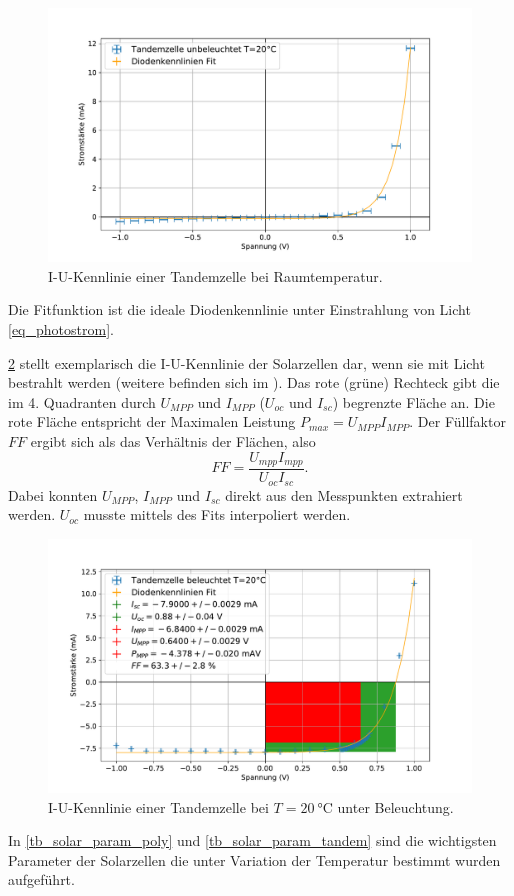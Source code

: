 \documentclass[
	a4paper,
	12pt,
	pagesize,
	ngerman
]{scrartcl}
\begin{document}
	\begin{figure}[H]
			\includegraphics[width=.9\linewidth]{img/Tandemzelle_unbeleuchtet_20.pdf}
			\caption{
				I-U-Kennlinie einer Tandemzelle bei Raumtemperatur.
								}
			\label{fig_tandem_unbeleuchtet_20}
	\end{figure}

	Die Fitfunktion ist die ideale Diodenkennlinie unter Einstrahlung von Licht \cref{eq_photostrom}.

	\cref{fig_tandem_beleuchtet_20} stellt exemplarisch die I-U-Kennlinie der Solarzellen dar, wenn sie mit Licht bestrahlt werden (weitere befinden sich im ).
	Das rote (grüne) Rechteck gibt die im 4. Quadranten durch $U_{MPP}$ und $I_{MPP}$ ($U_{oc}$ und $I_{sc}$) begrenzte Fläche an.
	Die rote Fläche entspricht der Maximalen Leistung $P_{max} = U_{MPP}I_{MPP}$.
	Der Füllfaktor $FF$ ergibt sich als das Verhältnis der Flächen, also
	\begin{equation}
		FF = \frac{U_{mpp}I_{mpp}}{U_{oc}I_{sc}}.
	\end{equation}
	Dabei konnten $U_{MPP}$, $I_{MPP}$ und $I_{sc}$ direkt aus den Messpunkten extrahiert werden.
	$U_{oc}$ musste mittels des Fits interpoliert werden.


	\begin{figure}[H]
			\includegraphics[width=.9\linewidth]{img/Tandemzelle_beleuchtet_20.pdf}
			\caption{
				I-U-Kennlinie einer Tandemzelle bei $T=\SI{20}{\celsius}$ unter Beleuchtung.
								}
			\label{fig_tandem_beleuchtet_20}
	\end{figure}
	In \cref{tb_solar_param_poly} und \cref{tb_solar_param_tandem} sind die wichtigsten Parameter der Solarzellen die unter Variation der Temperatur bestimmt wurden aufgeführt.
\end{document}
